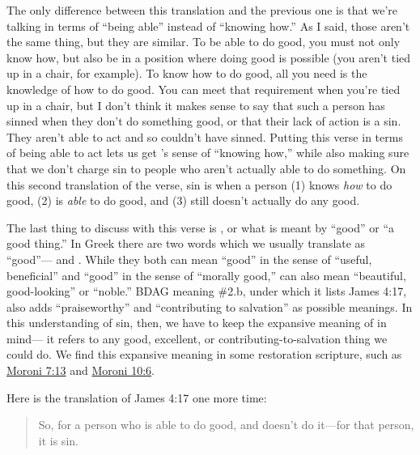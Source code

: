				\noindent The only difference between this translation and the previous one is that we're talking in terms of ``being able'' instead of ``knowing how.''
				As I said,
					those aren't the same thing,
						but they are similar.
				To be able to do good,
					you must not only know how,
						but also be in a position where doing good is possible (you aren't tied up in a chair,
							for example).
				To know how to do good,
					all you need is the knowledge of how to do good.
				You can meet that requirement when you're tied up in a chair,
					but I don't think it makes sense to say that such a person has sinned when they don't do something good,
						or that their lack of action is a sin.
				They aren't able to act and so couldn't have sinned.
				Putting this verse in terms of being able to act lets us get 's sense of ``knowing how,''
					while also making sure that we don't charge sin to people who aren't actually able to do something.
				On this second translation of the verse,
					sin is when a person (1) knows \textit{how} to do good,
						(2) is \textit{able} to do good,
							and (3) still doesn't actually do any good.
							
				The last thing to discuss with this verse is ,
					or what is meant by ``good'' or ``a good thing.''
				In Greek there are two words which we usually translate as ``good''---%
					\hyperref[KALOS]{} and \hyperref[AGATHOS]{}.
				While they both can mean ``good'' in the sense of ``useful, beneficial'' and ``good'' in the sense of ``morally good,''
					 can also mean ``beautiful, good-looking'' or ``noble.''
				BDAG meaning \#2.b,
					under which it lists James 4:17,
						also adds ``praiseworthy'' and ``contributing to salvation'' as possible meanings.
				In this understanding of sin,
					then,
						we have to keep the expansive meaning of  in mind---%
							it refers to any good,
								excellent,
									or contributing-to-salvation thing we could do.
				We find this expansive meaning in some restoration scripture,
					such as \hyperref[MORONI-7-13]{Moroni 7:13} and \hyperref[MORONI-10-6]{Moroni 10:6}.
					
				Here is the translation of James 4:17 one more time:
				
					\begin{quote}
						So, for a person who is able to do good, and doesn't do it---for that person, it is sin.
					\end{quote}
			
